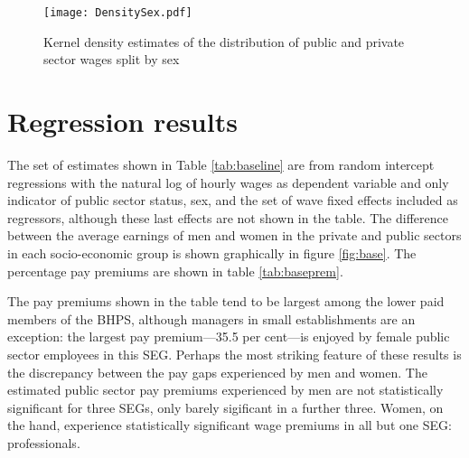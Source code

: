 \documentclass[a4paper,11pt,titlepage]{article}
\begin{document}
\begin{figure}[tb]
    \centering
    \texttt{[image: DensitySex.pdf]}
    \caption{Kernel density estimates of the distribution of public and private sector wages split by sex\label{fig:densitysex}}
\end{figure}

\section{Regression results}
The set of estimates shown in Table \ref{tab:baseline} are from random intercept regressions with the natural log of hourly wages as dependent variable and only indicator of public sector status, sex, and the set of wave fixed effects included as regressors, although these last effects are not shown in the table.  The difference between the average earnings of men and women in the private and public sectors in each socio-economic group is shown graphically in figure \ref{fig:base}. The percentage pay premiums are shown in table \ref{tab:baseprem}.

The pay premiums shown in the table tend to be largest among the lower paid
members of the BHPS, although managers in small establishments are an exception: the largest pay premium---35.5 per cent---is enjoyed by female public sector employees in this SEG.  Perhaps the most striking feature of these results
is the discrepancy between the pay gaps experienced by men and women.  The estimated public sector pay premiums experienced by men are not statistically significant for three SEGs, only barely sigificant in a further three.  Women, on the hand, experience statistically significant wage premiums in all but one SEG: professionals.
\end{document}
